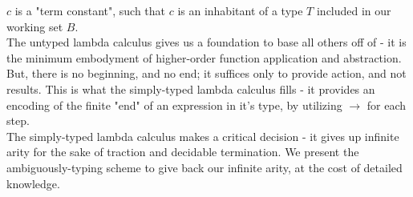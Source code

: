 \documentclass{article}
\begin{document}

\begin{flushleft}
$c$ is a "term constant", such that $c$ is an inhabitant of a type $T$ included
in our working set $B$.\\
\break
The untyped lambda calculus gives us a foundation to base all others off of -
it is the minimum embodyment of higher-order function application and abstraction.
But, there is no beginning, and no end; it suffices only to provide action, and
not results. This is what the simply-typed lambda calculus fills - it provides
an encoding of the finite "end" of an expression in it's type, by utilizing
$\rightarrow$ for each step.\\
\smallskip
The simply-typed lambda calculus makes a critical decision - it gives up
infinite arity for the sake of traction and decidable termination.
We present the ambiguously-typing scheme to give back our
infinite arity, at the cost of detailed knowledge.
\end{flushleft}
\end{document}
